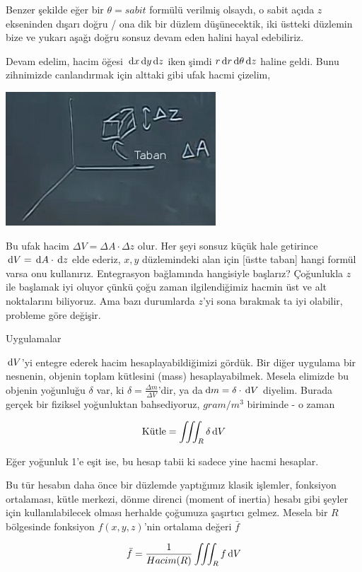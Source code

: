 \documentclass[12pt,fleqn]{article}\usepackage{../../common}
\begin{document}
Benzer şekilde eğer bir $\theta=sabit$ formülü verilmiş olsaydı, o sabit
açıda $z$ ekseninden dışarı doğru / ona dik bir düzlem düşünecektik, iki
üstteki düzlemin bize ve yukarı aşağı doğru sonsuz devam eden halini hayal
edebiliriz.

Devam edelim, hacim öğesi $\,\mathrm{d} x \,\mathrm{d} y \,\mathrm{d} z$ iken şimdi $r \,\mathrm{d} r \,\mathrm{d}
\theta \,\mathrm{d} z$ haline geldi. Bunu zihnimizde canlandırmak için alttaki gibi
ufak hacmi çizelim, 

\includegraphics[height=5cm]{25_10.png}

Bu ufak hacim $\Delta V = \Delta A \cdot \Delta z$ olur. Her şeyi sonsuz
küçük hale getirince $\,\mathrm{d} V = \,\mathrm{d} A \cdot \,\mathrm{d} z$ elde ederiz, $x,y$
düzlemindeki alan için [üstte taban] hangi formül varsa onu
kullanırız. Entegrasyon bağlamında hangisiyle başlarız? Çoğunlukla $z$ ile
başlamak iyi oluyor çünkü çoğu zaman ilgilendiğimiz hacmin üst ve alt
noktalarını biliyoruz. Ama bazı durumlarda $z$'yi sona bırakmak ta iyi
olabilir, probleme göre değişir.

Uygulamalar 

$\,\mathrm{d} V$'yi entegre ederek hacim hesaplayabildiğimizi gördük. Bir diğer
uygulama bir nesnenin, objenin toplam kütlesini (mass)
hesaplayabilmek. Mesela elimizde bu objenin yoğunluğu $\delta$ var, ki
$\delta = \frac{\Delta m}{\Delta V}$'dir, ya da$\,\mathrm{d} m = \delta \cdot \,\mathrm{d} V$
diyelim. Burada gerçek bir fiziksel yoğunluktan bahsediyoruz, $gram / m^3$
biriminde - o zaman

$$ 
\textrm{Kütle} = \iiint_R \delta \,\mathrm{d} V
$$

Eğer yoğunluk 1'e eşit ise, bu hesap tabii ki sadece yine hacmi
hesaplar. 

Bu tür hesabın daha önce bir düzlemde yaptığımız klasik işlemler, fonksiyon
ortalaması, kütle merkezi, dönme direnci (moment of inertia) hesabı gibi
şeyler için kullanılabilecek olması herhalde çoğumuza şaşırtıcı
gelmez. Mesela bir $R$ bölgesinde fonksiyon $f(x,y,z)$'nin ortalama değeri
$\bar{f}$

$$ 
\bar{f} = \frac{1}{Hacim(R)} \iiint_R f \,\mathrm{d} V
$$
 
\end{document}
